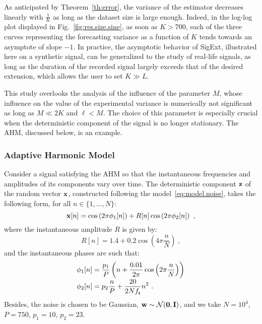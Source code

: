 As anticipated by Theorem~\ref{th:error}, the variance of the estimator decreases linearly with $\frac1K$ as long as the dataset size is large enough. Indeed, in the log-log plot displayed in Fig.~\ref{fig:res.size.sine}, as soon as $K>700$, each of the three curves representing the forecasting variance as a function of $K$ tends towards an asymptote of slope $-1$. 
%
{\color{red}
In practice, the asymptotic behavior of {\sf SigExt}, illustrated here on a synthetic signal, can be generalized to the study of real-life signals, as long as the duration of the recorded signal largely exceeds that of the desired extension, which allows the user to set $K\gg L$.
}


This study overlooks the analysis of the influence of the parameter $M$, whose influence on the value of the experimental variance is numerically not significant as long as $M\ll 2K$ and $\ell<M$. The choice of this parameter is especially crucial when the deterministic component of the signal is no longer stationary. The AHM, discussed below, is an example.

\subsubsection{Adaptive Harmonic Model}
\label{ssse:res.ahm}
Consider a signal satisfying the AHM so that the instantaneous frequencies and amplitudes of its components vary over time. The deterministic component ${\mathbf z}$ of the random vector ${\mathbf x}$, constructed following the model~\eqref{eq:model.noise}, takes the following form, for all $n\in\{1,\ldots,N\}$:
\[
{\mathbf x}[n] = \cos\left(2\pi \phi_1[n] \right) + R[n]\cos\left(2\pi \phi_2[n] \right) \ ,
\] 
where the instantaneous amplitude $R$ is given by:
\[
R[n] = 1.4 + 0.2\cos\left(4\pi\frac{n}{N}\right)\ ,
\]
and the instantaneous phases are such that:
\begin{align*}
\phi_1[n] &= \frac{p_1}{P}\left( n + \frac{0.01}{2\pi}\cos\left(2\pi\frac{n}{N}\right) \right) \\[-1mm]
\phi_2[n] & = p_2\frac{n}{P} + \frac{20}{2Nf_{\mathsf s}}n^2\ .
\end{align*}
Besides, the noise is chosen to be Gaussian, ${\mathbf w}\sim{\mathcal N}(\boldsymbol{0},{\mathbf I})$, and we take $N=10^4$, $P=750$, $p_1=10$, $p_2=23$.

